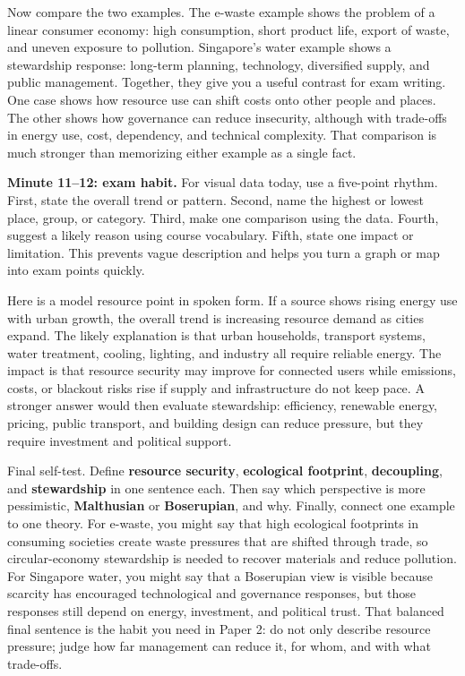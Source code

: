 \documentclass[11pt,a4paper]{article}
\newcommand{\term}[1]{\textcolor{HeadingBlue}{\textbf{#1}}}
\begin{document}
Now compare the two examples. The e-waste example shows the problem of a linear
consumer economy: high consumption, short product life, export of waste, and
uneven exposure to pollution. Singapore's water example shows a stewardship
response: long-term planning, technology, diversified supply, and public
management. Together, they give you a useful contrast for exam writing. One
case shows how resource use can shift costs onto other people and places. The
other shows how governance can reduce insecurity, although with trade-offs in
energy use, cost, dependency, and technical complexity. That comparison is much
stronger than memorizing either example as a single fact.

\textbf{Minute 11--12: exam habit.}
For visual data today, use a five-point rhythm. First, state the overall trend
or pattern. Second, name the highest or lowest place, group, or category. Third,
make one comparison using the data. Fourth, suggest a likely reason using course
vocabulary. Fifth, state one impact or limitation. This prevents vague
description and helps you turn a graph or map into exam points quickly.

Here is a model resource point in spoken form. If a source shows rising energy
use with urban growth, the overall trend is increasing resource demand as cities
expand. The likely explanation is that urban households, transport systems,
water treatment, cooling, lighting, and industry all require reliable energy.
The impact is that resource security may improve for connected users while
emissions, costs, or blackout risks rise if supply and infrastructure do not
keep pace. A stronger answer would then evaluate stewardship: efficiency,
renewable energy, pricing, public transport, and building design can reduce
pressure, but they require investment and political support.

Final self-test. Define \term{resource security}, \term{ecological footprint},
\term{decoupling}, and \term{stewardship} in one sentence each. Then say which
perspective is more pessimistic, \term{Malthusian} or \term{Boserupian}, and
why. Finally, connect one example to one theory. For e-waste, you might say that
high ecological footprints in consuming societies create waste pressures that
are shifted through trade, so circular-economy stewardship is needed to recover
materials and reduce pollution. For Singapore water, you might say that a
Boserupian view is visible because scarcity has encouraged technological and
governance responses, but those responses still depend on energy, investment,
and political trust. That balanced final sentence is the habit you need in
Paper 2: do not only describe resource pressure; judge how far management can
reduce it, for whom, and with what trade-offs.
\end{document}
